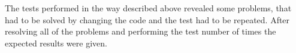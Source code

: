 The tests performed in the way described above revealed some problems, that had to be solved by changing the code and the test had to be repeated. After resolving all of the problems and performing the test number of times the expected results were given.




